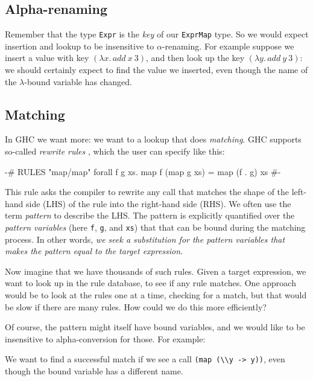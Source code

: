\documentclass[acmsmall]{acmart}
\theoremstyle{theorem}
\theoremstyle{definition}
\theoremstyle{remark}
\begin{document}
\subsection{Alpha-renaming}

Remember that the type \lstinline{Expr} is the \emph{key} of our \lstinline{ExprMap} type.
So we would expect insertion and lookup to be insensitive to
$\alpha$-renaming. For example suppose we insert a value with key
$(\lambda x.\, add~ x~ 3)$, and then look up the
key $(\lambda y.\, add~ y~ 3)$: we should
certainly expect to find the value we inserted, even though the name
of the $\lambda$-bound variable has changed.


\subsection{Matching} \label{sec:matching-intro}

In GHC we want more: we want to a lookup that does \emph{matching}.  GHC supports
so-called \emph{rewrite rules} \cite{rewrite-rule-paper}, which the user can specify like this:
\begin{code}
{-# RULES "map/map" forall f g xs. map f (map g xs) = map (f . g) xs #-}
\end{code}
This rule asks the compiler to rewrite any call that matches the shape
of the left-hand side (LHS) of the rule into the right-hand side
(RHS).  We often use the term \emph{pattern} to describe the LHS.
The pattern is explicitly quantified over the \emph{pattern variables}
(here \lstinline{f}, \lstinline{g}, and \lstinline{xs}) that
that can be bound during the matching process.  In other words, \emph{we seek a substitution
for the pattern variables that makes the pattern equal to the target expression}.

Now imagine that we have thousands of such rules.  Given a target
expression, we want to look up in the rule database, to see if any
rule matches.  One approach would be to look at the rules one at a
time, checking for a match, but that would be slow if there are many rules.
How could we do this more efficiently?

Of course, the pattern might itself have bound variables, and we would
like to be insensitive to alpha-conversion for those. For example:
\begin{code}
{-# RULES "map/id"  map (\\x -> x) = \\x -> x
\end{code}
We want to find a successful match if we see a call \lstinline{(map (\\y -> y))},
even though the bound variable has a different name.
\end{document}
